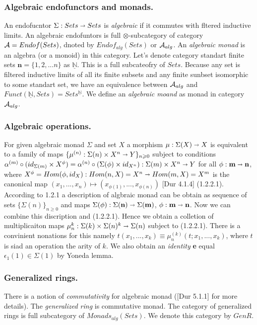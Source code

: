 		\subsubsection{Algebraic endofunctors and monads.} An endofucntor $ \Sigma : Sets \shortrightarrow Sets $ is
	    \textit{algebraic} if it commutes with fltered inductive limits. An algebraic endofuntors is full $ \otimes $-subcategory of
	    category $ \mathcal{A} = Endof(Sets) $, dnoted by $ Endof_{alg}(Sets) $ or $ \mathcal{A}_{alg} $. An \textit{algebraic monad} is an
	    algebra (or a monoid) in this category. Let's denote category standart finite sets $ \textbf{n} = \{1,2,...n\} $ as 
	    $\underline{\mathds{N}}$. This is a full subcateofry of $Sets$. Because any set is filtered inductive limits of all its finite subsets and any finite 
	    sunbset isomorphic to some standart set, we have an equivalence between $\mathcal{A}_{alg}$ and 
	    $ Funct(\underline{\mathds{N}}, Sets) = Sets^{\underline{\mathds{N}}} $. We define an \textit{algebraic moand} as monad in category $ \mathcal{A}_{alg} $.
	    \subsubsection{Algebraic operations.} For given algebraic monad $\Sigma$ and set $X$ a morphism $ \mu : \Sigma(X) \shortrightarrow X$
	    is equivalent to a family of maps $ \{ \mu^{(n)} : \Sigma(n) \times X^{n} \shortrightarrow Y \}_{n \geqslant 0} $ subject to conditions $ \alpha^{(m)} \circ (id_{\Sigma(m)} \times X^{\phi}) = \alpha^{(n)} \circ (\Sigma(\phi) \times id_{X^n{}}) : \Sigma(m) \times
	    X^{n} \shortrightarrow Y $ for all $ \phi : \textbf{m} \shortrightarrow \textbf{n} $, where $ X^{\phi} = Hom(\phi,id_{X}) : Hom(n,X) = X^{n}
	    \shortrightarrow Hom(m,X) = X^{m} $ is the canonical map $ (x_{1},...,x_{n}) \mapsto (x_{\phi(1)},...,x_{\phi(n)}) $ [Dur 4.1.4] (1.2.2.1).
        According to 1.2.1 a description of algbraic monad can be obtain as sequence of sets $ \{\Sigma(n)\}_{n \geqslant 0} $
        and maps $ \Sigma(\phi) : \Sigma(\textbf{n}) \shortrightarrow \Sigma(\textbf{m}) $, $ \phi : \textbf{m} \shortrightarrow \textbf{n} $. Now we can combine this discription and (1.2.2.1). Hence we obtain a colletion of multiplicaiton maps $ \mu_{n}^{k} : \Sigma(k) \times
        \Sigma(n)^{k} \shortrightarrow \Sigma(n) $ subject to (1.2.2.1). There is a convinient nonations for this namely 
        $ t(x_{1},...,x_{k}) \equiv \mu_{n}^{(k)}(t; x_{1},...,x_{k}) $, where $t$ is siad an operation the arity of $k$. 
        We also obtain an \textit{identity} \textbf{e} equal
        $ \epsilon_{1}(1) \in \Sigma(1) $ by Yoneda lemma.
        \subsubsection{Generalized rings.} There is a notion of \textit{commutativity} for algebraic monad
        ([Dur 5.1.1] for more details). The \textit{generalized ring} is commutative monad. The category of generalized rings is
        full subcategory of $ Monads_{alg}(Sets) $. We denote this category by $ GenR $.
	
